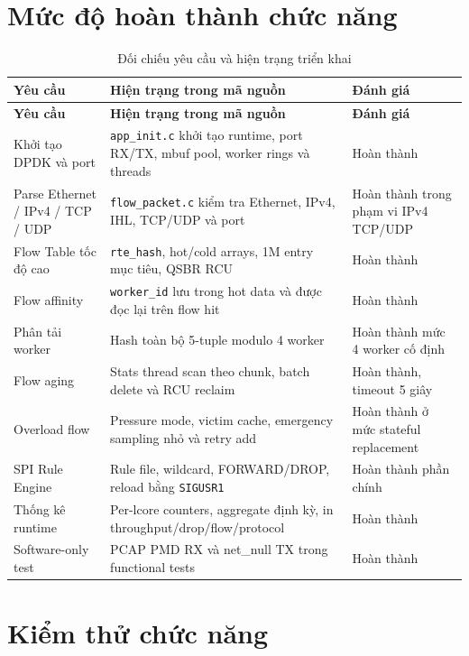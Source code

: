 \documentclass[12pt,a4paper]{report}
\DeclareRobustCommand{\code}[1]{{\small\texttt{#1}}}
\begin{document}
\section{Mức độ hoàn thành chức năng}

{\footnotesize
\begin{longtable}{|L{4.5cm}|L{6.6cm}|L{3.7cm}|}
\caption{Đối chiếu yêu cầu và hiện trạng triển khai}
\label{tab:requirements}\\
\hline
\textbf{Yêu cầu} & \textbf{Hiện trạng trong mã nguồn} & \textbf{Đánh giá} \\
\hline
\endfirsthead
\hline
\textbf{Yêu cầu} & \textbf{Hiện trạng trong mã nguồn} & \textbf{Đánh giá} \\
\hline
\endhead
Khởi tạo DPDK và port & \code{app\_init.c} khởi tạo runtime, port RX/TX, mbuf pool, worker rings và threads & Hoàn thành \\
\hline
Parse Ethernet / IPv4 / TCP / UDP & \code{flow\_packet.c} kiểm tra Ethernet, IPv4, IHL, TCP/UDP và port & Hoàn thành trong phạm vi IPv4 TCP/UDP \\
\hline
Flow Table tốc độ cao & \code{rte\_hash}, hot/cold arrays, 1M entry mục tiêu, QSBR RCU & Hoàn thành \\
\hline
Flow affinity & \code{worker\_id} lưu trong hot data và được đọc lại trên flow hit & Hoàn thành \\
\hline
Phân tải worker & Hash toàn bộ 5-tuple modulo 4 worker & Hoàn thành mức 4 worker cố định \\
\hline
Flow aging & Stats thread scan theo chunk, batch delete và RCU reclaim & Hoàn thành, timeout 5 giây \\
\hline
Overload flow & Pressure mode, victim cache, emergency sampling nhỏ và retry add & Hoàn thành ở mức stateful replacement \\
\hline
SPI Rule Engine & Rule file, wildcard, FORWARD/DROP, reload bằng \code{SIGUSR1} & Hoàn thành phần chính \\
\hline
Thống kê runtime & Per-lcore counters, aggregate định kỳ, in throughput/drop/flow/protocol & Hoàn thành \\
\hline
Software-only test & PCAP PMD RX và net\_null TX trong functional tests & Hoàn thành \\
\hline
\end{longtable}
}

\section{Kiểm thử chức năng}
\end{document}
